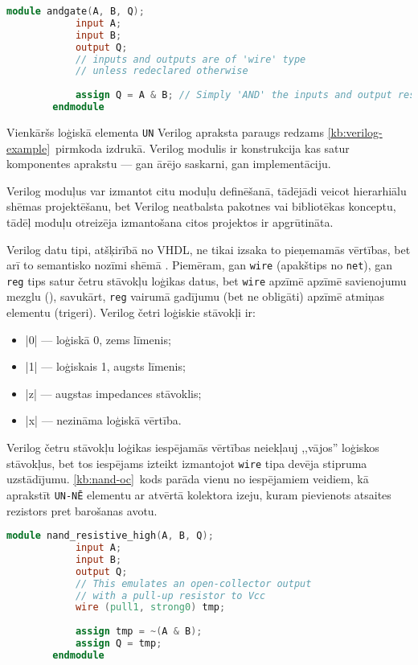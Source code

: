 	\begin{lstlisting}[language={Verilog},label=kb:verilog-example,gobble=4,%
			caption={Verilog apraksts loģiskajam \texttt{UN} elementam.}]
		module andgate(A, B, Q);
			input A;
			input B;
			output Q;
			// inputs and outputs are of 'wire' type
			// unless redeclared otherwise
			
			assign Q = A & B; // Simply 'AND' the inputs and output result
		endmodule
	\end{lstlisting}

	Vienkāršs loģiskā elementa \texttt{UN} Verilog apraksta paraugs redzams
	\ref{kb:verilog-example}~pirmkoda izdrukā.
	Verilog modulis ir konstrukcija kas satur komponentes aprakstu
	--- gan ārējo saskarni, gan implementāciju.
	
	Verilog moduļus var izmantot citu moduļu definēšanā, tādējādi veicot
	hierarhiālu shēmas projektēšanu, bet Verilog neatbalsta pakotnes vai
	bibliotēkas konceptu, tādēļ moduļu otreizēja izmantošana citos projektos
	ir apgrūtināta.
	
	Verilog datu tipi, atšķirībā no VHDL, ne tikai izsaka
	to pieņemamās vērtības, bet arī to semantisko nozīmi shēmā
	\cite[21.~lpp.]{Vivek-Verilog}. Piemēram,
	gan \texttt{wire} (apakštips no \texttt{net}), gan \texttt{reg} tips
	satur četru stāvokļu loģikas datus, bet \texttt{wire} apzīmē
	apzīmē savienojumu mezglu (), savukārt, \texttt{reg}
	vairumā gadījumu (bet ne obligāti) apzīmē atmiņas elementu (trigeri).
	Verilog četri loģiskie stāvokļi ir:
	\begin{itemize}
		\item |0| --- loģiskā 0, zems līmenis;
		\item |1| --- loģiskais 1, augsts līmenis;
		\item |z| --- augstas impedances stāvoklis;
		\item |x| --- nezināma loģiskā vērtība.
	\end{itemize}
	
	Verilog četru stāvokļu loģikas iespējamās vērtības neiekļauj
	,,vājos'' loģiskos stāvokļus, bet tos iespējams izteikt izmantojot
	\texttt{wire} tipa devēja stipruma uzstādījumu. \ref{kb:nand-oc}~kods
	parāda vienu no iespējamiem veidiem, kā aprakstīt \texttt{UN-NĒ}
	elementu ar atvērtā kolektora izeju, kuram pievienots atsaites rezistors
	pret barošanas avotu.
	\begin{lstlisting}[language={Verilog},label=kb:nand-oc,gobble=4,%
			caption={Verilog pieraksta paraugs devēja stipruma uzstādījumam.}]
		module nand_resistive_high(A, B, Q);
			input A;
			input B;
			output Q;
			// This emulates an open-collector output
			// with a pull-up resistor to Vcc
			wire (pull1, strong0) tmp;
			
			assign tmp = ~(A & B);
			assign Q = tmp;
		endmodule
	\end{lstlisting}
	
